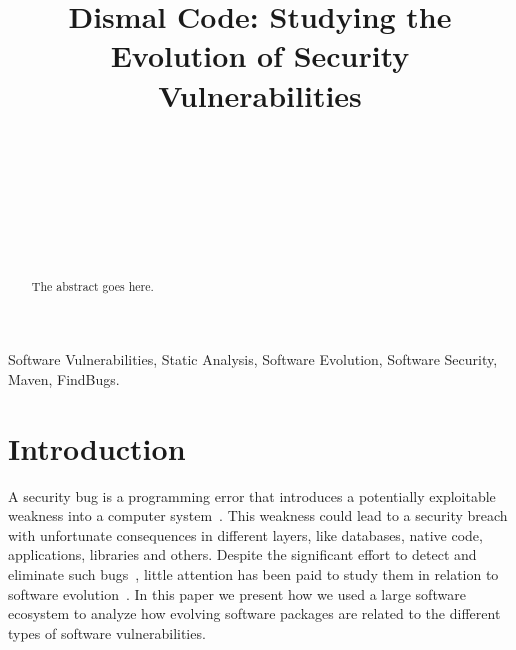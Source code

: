 \documentclass[conference]{IEEEtran}
\begin{document}
\title{Dismal Code: Studying the Evolution of Security Vulnerabilities}

\author{
\\
\and
{}
\\
\and
{}
\\
\and
{}
\\
\and
{}
}

\maketitle

\begin{abstract}
The abstract goes here.
\end{abstract}

\begin{IEEEkeywords}
Software Vulnerabilities, Static Analysis, Software Evolution, Software
Security, Maven, FindBugs.
\end{IEEEkeywords}

\IEEEpeerreviewmaketitle

\section{Introduction}

A security bug is a programming error that introduces a potentially
exploitable weakness into a computer system~\cite{SSL12}. This weakness could lead to a
security breach with unfortunate consequences in different layers, like databases,
native code, applications, libraries and others. Despite the significant
effort to detect and eliminate such bugs~\cite{SZ12}, little attention has been paid to
study them in relation to software evolution~\cite{L96, LRWPT97, IB06}. In this paper we present how we
used a large software ecosystem to analyze how evolving software packages are
related to the different types of software vulnerabilities.
\end{document}
